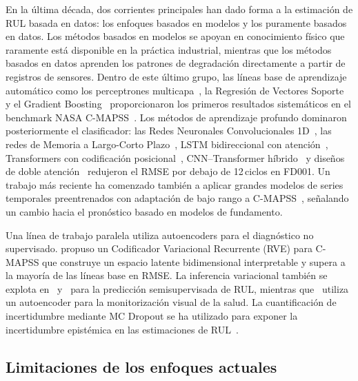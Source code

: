 \documentclass[5p,times,authoryear]{elsarticle}
\begin{document}
En la última década, dos corrientes principales han dado forma a la estimación de RUL basada en datos: los enfoques basados en modelos y los puramente basados en datos. Los métodos basados en modelos se apoyan en conocimiento físico que raramente está disponible en la práctica industrial, mientras que los métodos basados en datos aprenden los patrones de degradación directamente a partir de registros de sensores. Dentro de este último grupo, las líneas base de aprendizaje automático como los perceptrones multicapa~\citep{tian2012artificial}, la Regresión de Vectores Soporte~\citep{khelif2017direct} y el Gradient Boosting~\citep{babu2016deep} proporcionaron los primeros resultados sistemáticos en el benchmark NASA C-MAPSS~\citep{saxena2008damage}. Los métodos de aprendizaje profundo dominaron posteriormente el clasificador: las Redes Neuronales Convolucionales 1D~\citep{li2018remaining}, las redes de Memoria a Largo-Corto Plazo~\citep{zheng2017long,asif2022deep}, LSTM bidireccional con atención~\citep{chen2020machine,mo2022remaining}, Transformers con codificación posicional~\citep{zhu2021transformer}, CNN--Transformer híbrido~\citep{song2023cnntrf} y diseños de doble atención~\citep{liu2023dual,wang2024hybrid} redujeron el RMSE por debajo de 12\,ciclos en FD001. Un trabajo más reciente ha comenzado también a aplicar grandes modelos de series temporales preentrenados con adaptación de bajo rango a C-MAPSS~\citep{chakravarty2025llm4ts}, señalando un cambio hacia el pronóstico basado en modelos de fundamento.

Una línea de trabajo paralela utiliza autoencoders para el diagnóstico no supervisado. \citet{costa2022rve} propuso un Codificador Variacional Recurrente (RVE) para C-MAPSS que construye un espacio latente bidimensional interpretable y supera a la mayoría de las líneas base en RMSE. La inferencia variacional también se explota en~\citet{ellefsen2019remaining} y~\citet{xiang2021multicellular} para la predicción semisupervisada de RUL, mientras que~\citet{martinez2019visually} utiliza un autoencoder para la monitorización visual de la salud. La cuantificación de incertidumbre mediante MC Dropout se ha utilizado para exponer la incertidumbre epistémica en las estimaciones de RUL~\citep{xu2021machine}.

\subsection{Limitaciones de los enfoques actuales}\label{sec:limits}
\end{document}
